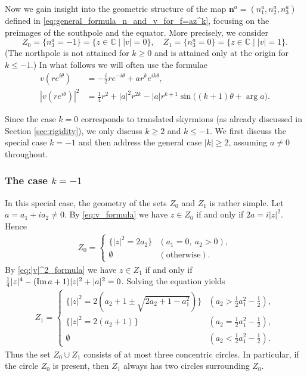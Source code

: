 \documentclass{amsart}
\numberwithin{equation}{section}
\theoremstyle{definition}
\theoremstyle{remark}
\newcommand{\C}{\mathbb{C}}
\renewcommand{\Im}{\mathop{{\rm Im}}\nolimits}
\newcommand{\bn}{{\mathbf{n}}}
\begin{document}
Now we gain insight into the geometric structure of the map $\bn^a=(n^a_1,n^a_2,n^a_3)$ defined in \eqref{eq:general_formula_n_and_v_for_f=az^k}, focusing on the preimages of the southpole and the equator.
More precisely, we consider
\[
Z_0=\{ n^a_3=-1 \}=\{z\in\C \mid |v|=0 \}, \quad Z_1=\{n^a_3=0\}=\{z\in\C \mid |v|=1 \}.
\]
(The northpole is not attained for $k\geq0$ and is attained only at the origin for $k\leq-1$.)
In what follows we will often use the formulae 
\begin{align}
    v(re^{i\theta}) &= -\frac{i}{2}re^{-i\theta}+ar^ke^{ik\theta}, \label{eq:v_formula} \\
    |v(re^{i\theta})|^2 &= \frac{1}{4}r^2+|a|^2r^{2k}-|a|r^{k+1}\sin\big( (k+1)\theta+\arg{a} \big). \label{eq:|v|^2_formula}
\end{align}

Since the case $k=0$ corresponds to translated skyrmions (as already discussed in Section \ref{sec:rigidity}), we only discuss $k\geq2$ and $k\leq-1$.
We first discuss the special case $k=-1$ and then address the general case $|k|\geq2$, assuming $a\neq0$ throughout.

\subsubsection{The case $k=-1$}
In this special case, the geometry of the sets $Z_0$ and $Z_1$ is rather simple.
Let $a=a_1+ia_2\neq0$.
By \eqref{eq:v_formula} we have $z\in Z_0$ if and only if $2a=i|z|^2$.
Hence
\begin{align*}
    Z_0=
    \begin{cases}
       \{ |z|^2=2a_2 \} & (a_1=0,\ a_2>0),\\
       \emptyset & (\text{otherwise}).
    \end{cases}
\end{align*}
By \eqref{eq:|v|^2_formula} we have $z\in Z_1$ if and only if $\frac{1}{4}|z|^4-(\Im{a}+1)|z|^2+|a|^2=0$.
Solving the equation yields
\begin{align*}
    Z_1=
    \begin{cases}
       \big\{ |z|^2=2 ( a_2+1 \pm \sqrt{2a_2+1-a_1^2} ) \big\} & (a_2>\frac{1}{2}a_1^2-\frac{1}{2}),\\
       \{ |z|^2=2(a_2+1) \} & (a_2=\frac{1}{2}a_1^2-\frac{1}{2}),\\
       \emptyset & (a_2<\frac{1}{2}a_1^2-\frac{1}{2}).
    \end{cases}
\end{align*}
Thus the set $Z_0\cup Z_1$ consists of at most three concentric circles.
In particular, if the circle $Z_0$ is present, then $Z_1$ always has two circles surrounding $Z_0$.
\end{document}
